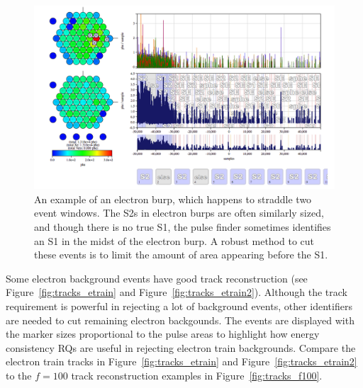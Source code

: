 \begin{figure}[htbp]
\begin{center}
\includegraphics[width=\textwidth]{figures/lips/eburp.png}
\caption{An example of an electron burp, which happens to straddle two event windows. The S2s in electron burps are often similarly sized, and though there is no true S1, the pulse finder sometimes identifies an S1 in the midst of the electron burp. A robust method to cut these events is to limit the amount of area appearing before the S1.}
\label{fig:eburp_lip}
\end{center}
\end{figure}

Some electron background events have good track reconstruction (see Figure~\ref{fig:tracks_etrain} and Figure~\ref{fig:tracks_etrain2}). Although the track requirement is powerful in rejecting a lot of background events, other identifiers are needed to cut remaining electron backgounds. The events are displayed with the marker sizes proportional to the pulse areas to highlight how energy consistency \ac{RQ}s are useful in rejecting electron train backgrounds. Compare the electron train tracks in Figure~\ref{fig:tracks_etrain} and Figure~\ref{fig:tracks_etrain2} to the $f=100$ track reconstruction examples in Figure~\ref{fig:tracks_f100}. 


